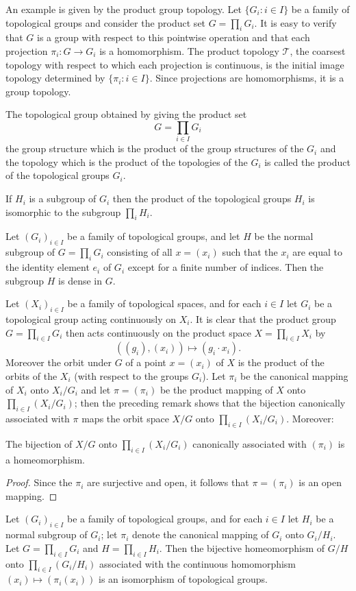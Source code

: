 An example is given by the product group topology. Let $\{G_i:i\in I\}$ be a family of topological groups and consider the product set $G=\prod_iG_i$. It is easy to verify that $G$ is a group with respect to this pointwise operation and that each projection $\pi_i:G\to G_i$ is a homomorphism. The product topology $\mathcal{T}$, the coarsest topology with respect to which each projection is continuous, is the initial image topology determined by $\{\pi_i:i\in I\}$. Since projections are homomorphisms, it is a group topology.
\begin{definition}
The topological group obtained by giving the product set
\[G=\prod_{i\in I}G_i\]
the group structure which is the product of the group structures of the $G_i$ and the topology which is the product of the topologies of the $G_i$ is called the product of the topological groups $G_i$.
\end{definition}
If $H_i$ is a subgroup of $G_i$ then the product of the topological groups $H_i$ is isomorphic to the subgroup $\prod_iH_i$.
\begin{proposition}
Let $(G_i)_{i\in I}$ be a family of topological groups, and let $H$ be the normal subgroup of $G=\prod_iG_i$ consisting of all $x=(x_i)$ such that the $x_i$ are equal to the identity element $e_i$ of $G_i$ except for a finite number of indices. Then the subgroup $H$ is dense in $G$.
\end{proposition}
Let $(X_i)_{i\in I}$ be a family of topological spaces, and for each $i\in I$ let $G_i$ be a topological group acting continuously on $X_i$. It is clear that the product group $G=\prod_{i\in I}G_i$ then acts continuously on the product space $X=\prod_{i\in I}X_i$ by
\[((g_i),(x_i))\mapsto(g_i\cdot x_i).\]
Moreover the orbit under $G$ of a point $x=(x_i)$ of $X$ is the product of the orbits of the $X_i$ (with respect to the groups $G_i$). Let $\pi_i$ be the canonical mapping of $X_i$ onto $X_i/G_i$ and let $\pi=(\pi_i)$ be the product mapping of $X$ onto $\prod_{i\in I}(X_i/G_i)$; then the preceding remark shows that the bijection canonically associated with $\pi$ maps the orbit space $X/G$ onto $\prod_{i\in I}(X_i/G_i)$. Moreover:
\begin{proposition}\label{topological group orbit space product}
The bijection of $X/G$ onto $\prod_{i\in I}(X_i/G_i)$ canonically associated with $(\pi_i)$ is a homeomorphism.
\end{proposition}
\begin{proof}
Since the $\pi_i$ are surjective and open, it follows that $\pi=(\pi_i)$ is an open mapping.
\end{proof}
\begin{corollary}\label{topological group quotient commute with product}
Let $(G_i)_{i\in I}$ be a family of topological groups, and for each $i\in I$ let $H_i$ be a normal subgroup of $G_i$; let $\pi_i$ denote the canonical mapping of $G_i$ onto $G_i/H_i$. Let $G=\prod_{i\in I}G_i$ and $H=\prod_{i\in I}H_i$. Then the bijective homeomorphism of $G/H$ onto $\prod_{i\in I}(G_i/H_i)$ associated with the continuous homomorphism $(x_i)\mapsto(\pi_i(x_i))$ is an isomorphism of topological groups.
\end{corollary}
